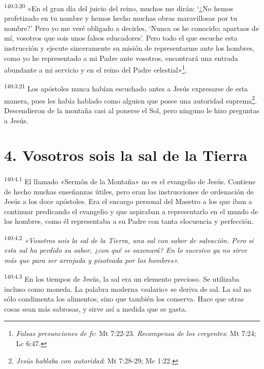 \par
\textsuperscript{140:3.20} «En el gran día del juicio del reino, muchos me dirán: `¿No hemos profetizado en tu nombre y hemos hecho muchas obras maravillosas por tu nombre?' Pero yo me veré obligado a decirles, `Nunca os he conocido; apartaos de mí, vosotros que sois unos falsos educadores'. Pero todo el que escuche esta instrucción y ejecute sinceramente su misión de representarme ante los hombres, como yo he representado a mi Padre ante vosotros, encontrará una entrada abundante a mi servicio y en el reino del Padre celestial»\footnote{\textit{Falsas presunciones de fe}: Mt 7:22-23. \textit{Recompensa de los creyentes}: Mt 7:24; Lc 6:47.}.

\par
\textsuperscript{140:3.21} Los apóstoles nunca habían escuchado antes a Jesús expresarse de esta manera, pues les había hablado como alguien que posee una autoridad suprema\footnote{\textit{Jesús hablaba con autoridad}: Mt 7:28-29; Mc 1:22.}. Descendieron de la montaña casi al ponerse el Sol, pero ninguno le hizo preguntas a Jesús.

\section*{4. Vosotros sois la sal de la Tierra}
\par
\textsuperscript{140:4.1} El llamado «Sermón de la Montaña» no es el evangelio de Jesús. Contiene de hecho muchas enseñanzas útiles, pero eran las instrucciones de ordenación de Jesús a los doce apóstoles. Era el encargo personal del Maestro a los que iban a continuar predicando el evangelio y que aspiraban a representarlo en el mundo de los hombres, como él representaba a su Padre con tanta elocuencia y perfección.

\par
\textsuperscript{140:4.2} \textit{«Vosotros sois la sal de la Tierra, una sal con sabor de salvación. Pero si esta sal ha perdido su sabor, ¿con qué se sazonará? En lo sucesivo ya no sirve más que para ser arrojada y pisoteada por los hombres».}

\par
\textsuperscript{140:4.3} En los tiempos de Jesús, la sal era un elemento precioso. Se utilizaba incluso como moneda. La palabra moderna «salario» se deriva de sal. La sal no sólo condimenta los alimentos, sino que también los conserva. Hace que otras cosas sean más sabrosas, y sirve así a medida que se gasta.

